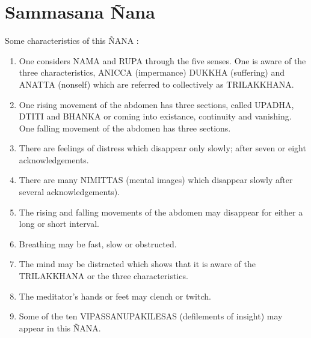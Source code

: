 \documentclass[a5paper,10pt,english]{book}
\begin{document}
\section{Sammasana Ñana}
\label{\detokenize{progress:sammasana-nana}}
\sphinxAtStartPar
{}

\sphinxAtStartPar
Some characteristics of this ÑANA  :\sphinxhyphen{}
\begin{enumerate}
%
\item {} 
\sphinxAtStartPar
One considers NAMA and RUPA through the five senses. One is aware of the three characteristics, ANICCA (impermance) DUKKHA (suffering) and ANATTA (non\sphinxhyphen{}self) which are   referred to collectively as TRILAKKHANA.

\item {} 
\sphinxAtStartPar
One rising movement of the abdomen has three sections, called UPADHA, DTITI and BHANKA or coming into existance, continuity and vanishing. One falling movement of the abdomen has three sections.

\item {} 
\sphinxAtStartPar
There are feelings of distress which disappear only slowly; after seven or eight acknowledgements.

\item {} 
\sphinxAtStartPar
There are many NIMITTAS (mental images) which disappear slowly after several acknowledgements).

\item {} 
\sphinxAtStartPar
The rising and falling movements of the abdomen may disappear for either a long or short interval.

\item {} 
\sphinxAtStartPar
Breathing may be fast, slow or obstructed.

\item {} 
\sphinxAtStartPar
The mind may be distracted which shows that it is aware of the TRILAKKHANA or the three characteristics.

\item {} 
\sphinxAtStartPar
The meditator’s hands or feet may clench or twitch.

\item {} 
\sphinxAtStartPar
Some of the ten VIPASSANUPAKILESAS (defilements of insight) may appear in this ÑANA.

\end{enumerate}
\end{document}
